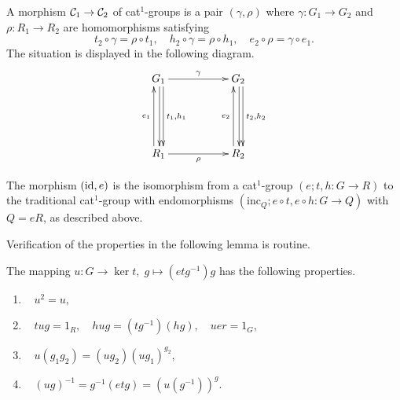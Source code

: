 \medskip
A morphism  $\mathcal{C}_1 \to \mathcal{C}_2$  
  
of cat$^1$-groups is a pair  $(\gamma, \rho)$  where
$\gamma : G_1 \to G_2$  and  $\rho : R_1 \to R_2$  
are homomorphisms satisfying
\begin{equation} \label{eq:cat1mor}
t_2 \circ\gamma = \rho\circ t_1, \quad
h_2 \circ\gamma = \rho\circ h_1, \quad
e_2 \circ\rho = \gamma\circ e_1.
\end{equation}
The situation is displayed in the following diagram. 
\begin{equation*} \label{eq:cat1mordiag}
\vcenter{\xymatrix{
   G_1 \ar[rr]^{\gamma} \ar[dd]<1.0ex>^{t_1,h_1} \ar[dd]<0.2ex> 
     && G_2 \ar[dd]<1.0ex>^{t_2,h_2} \ar[dd]<0.2ex>\\
     &&  \\
   R_1 \ar[rr]_{\rho} \ar[uu]<1.0ex>^{e_1} 
     && R_2 \ar[uu]<1.0ex>^{e_2}
}}
\end{equation*}

The morphism $(\mathrm{id},e)$ is the isomorphism from a cat$^1$-group $(e;t,h : G \to R)$ to the traditional cat$^1$-group with endomorphisms 
$(\mathrm{inc}_Q; e \circ t, e \circ h : G \to Q)$ with $Q = eR$, 
as described above. 

\medskip
Verification of the properties in the following lemma is routine. 

\begin{lem} \label{lem:u-props}
The mapping $u : G \to \ker t,\; g \mapsto (etg^{-1})g$ has the
following properties.
\begin{enumerate}[{\rm (i)}]
\item~ $u^2 = u,$
\item~ $tug = 1_R,\quad hug = (tg^{-1})(hg),\quad uer = 1_G, $
\item~ $u(g_1g_2) = (ug_2)(ug_1)^{g_2},$
\item~ $(ug)^{-1} = g^{-1}(etg) = (u(g^{-1}))^g.$
\end{enumerate}
\end{lem}

